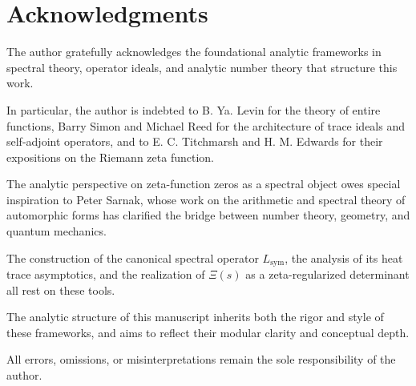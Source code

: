 \section*{Acknowledgments}

The author gratefully acknowledges the foundational analytic frameworks in spectral theory, operator ideals, and analytic number theory that structure this work.

In particular, the author is indebted to B. Ya. Levin for the theory of entire functions, Barry Simon and Michael Reed for the architecture of trace ideals and self-adjoint operators, and to E. C. Titchmarsh and H. M. Edwards for their expositions on the Riemann zeta function.

The analytic perspective on zeta-function zeros as a spectral object owes special inspiration to Peter Sarnak, whose work on the arithmetic and spectral theory of automorphic forms has clarified the bridge between number theory, geometry, and quantum mechanics.

The construction of the canonical spectral operator \( L_{\mathrm{sym}} \), the analysis of its heat trace asymptotics, and the realization of \( \Xi(s) \) as a zeta-regularized determinant all rest on these tools.

\vspace{0.5em}
\noindent
The analytic structure of this manuscript inherits both the rigor and style of these frameworks, and aims to reflect their modular clarity and conceptual depth.

\vspace{0.5em}
\noindent
All errors, omissions, or misinterpretations remain the sole responsibility of the author.
